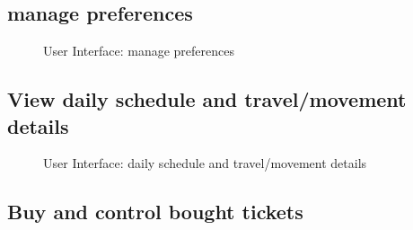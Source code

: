 \subsection{manage preferences}
\begin{figure}[!h]
	\centering
	\caption{User Interface: manage preferences}
\end{figure}
\clearpage

\subsection{View daily schedule and travel/movement details}

\begin{figure}[!h]
	\centering
	\caption{User Interface: daily schedule and travel/movement details}
\end{figure}
\clearpage

\subsection{Buy and control bought tickets}

